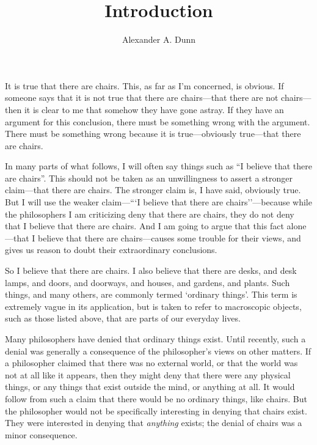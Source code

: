 \documentclass[11pt]{article}
\title{Introduction}
\author{Alexander A. Dunn}
\begin{document}
\ifstandalone
\maketitle
\begin{spacing}{1.5}
\fi

It is true that there are chairs.  This, as far as I'm concerned, is
obvious.  If someone says that it is not true that there are
chairs---that there are not chairs---then it is clear to me that
somehow they have gone astray.  If they have an argument for this
conclusion, there must be something wrong with the argument.  There
must be something wrong because it is true---obviously true---that
there are chairs.

In many parts of what follows, I will often say things such as ``I
believe that there are chairs''.  This should not be taken as an
unwillingness to assert a stronger claim---that there are chairs.  The
stronger claim is, I have said, obviously true.  But I will use the
weaker claim---```I believe that there are chairs''---because while
the philosophers I am criticizing deny that there are chairs, they do
not deny that I believe that there are chairs.  And I am going to
argue that this fact alone---that I believe that there are
chairs---causes some trouble for their views, and gives us reason to
doubt their extraordinary conclusions.

So I believe that there are chairs.  I also believe that there are
desks, and desk lamps, and doors, and doorways, and houses, and
gardens, and plants.  Such things, and many others, are commonly
termed `ordinary things'.  This term is extremely vague in its
application, but is taken to refer to macroscopic objects, such as
those listed above, that are parts of our everyday lives.

Many philosophers have denied that ordinary things exist.  Until
recently, such a denial was generally a consequence of the
philosopher's views on other matters.  If a philosopher claimed that
there was no external world, or that the world was not at all like it
appears, then they might deny that there were any physical things, or
any things that exist outside the mind, or anything at all.  It would
follow from such a claim that there would be no ordinary things, like
chairs.  But the philosopher would not be specifically interesting in
denying that chairs exist.  They were interested in denying that {\em
  anything} exists; the denial of chairs was a minor consequence.


\end{spacing}
\end{document}
